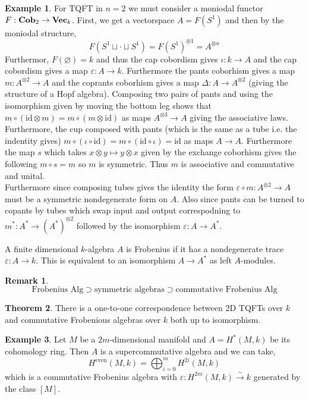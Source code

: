 \documentclass[12pt]{extarticle}
\newcommand{\id}{\mathrm{id}}
\theoremstyle{definition}
\newtheorem{theorem}{Theorem}[section]
\newtheorem{example}[theorem]{Example}
\newtheorem{remark}{Remark}
\newenvironment{definition}[1][Definition:]{\begin{trivlist}
\item[\hskip \labelsep {\bfseries #1}]}{\end{trivlist}}
\begin{document}
\begin{example}
For TQFT in $n = 2$ we must consider a moniodal functor $F : \mathbf{Cob}_2 \to \mathbf{Vec}_k$. First, we get a vectorspace $A = F(S^1)$ and then by the moniodal structure,
\[ F(S^1 \sqcup \cdot \sqcup S^1) = F(S^1)^{\otimes 1} = A^{\otimes n} \]
Furthermor, $F(\varnothing) = k$ and thus the cap cobordism gives $\iota : k \to A$ and the cap cobordism gives a map $\varepsilon : A \to k$. Furthermore the pants coborhism gives a map $m : A^{\otimes 2} \to A$ and the coprants coborhism gives a map $\Delta : A \to A^{\otimes 2}$ (giving the structure of a Hopf algebra). Composing two pairs of pants and using the isomorphism given by moving the bottom leg shows that $m \circ (\id \otimes m) = m \circ (m \otimes \id)$ as maps $A^{\otimes 3} \to A$ giving the associative laws. Furthermore, the cup composed with pants (which is the same as a tube i.e. the indentity gives) $m \circ (\iota \circ \id) = m \circ (\id \circ \iota) = \id$ as maps $A \to A$. Furthermore the map $s$ which takes $x \otimes y \mapsto y \otimes x$ given by the exchange coborhism gives the following $m \circ s = m$ so $m$ is symmetric. Thus $m$ is associative and commutative and unital. 
\bigskip\\
Furthermore since composing tubes gives the identity the form $\varepsilon \circ m : A^{\otimes 2} \to A$ must be a symmetric nondegenerate form on $A$. Also since pants can be turned to copants by tubes which swap input and output correspodning to $m^* : A^* \to (A^*)^{\otimes 2}$ followed by the isomorphism $\varepsilon : A \to A^*$.
\end{example}

\begin{definition}
A finite dimensional $k$-algebra $A$ is Frobenius if it has a nondegenerate trace $\varepsilon : A \to k$. This is equivalent to an isomorphism $A \to A^*$ as left $A$-modules. 
\end{definition}

\begin{remark}
\[ \text{Frobenius Alg} \supset \text{symmetric algebras} \supset \text{commutative Frobenius Alg} \]
\end{remark}

\begin{theorem}
There is a one-to-one correspondence between 2D TQFTs over $k$ and commutative Frobenious algebras over $k$ both up to isomorphism. 
\end{theorem}

\begin{example}
Let $M$ be a $2m$-dimensional manifold and $A = H^*(M, k)$ be its cohomology ring. Then $A$ is a supercommutative algebra and we can take,
\[ H^{\text{even}}(M, k) = \bigoplus_{i = 0}^m H^{2i}(M, k) \]
which is a commutative Frobenius algebra with $\varepsilon : H^{2m}(M, k) \xrightarrow{\sim} k$ generated by the class $[M]$.  
\end{example}
\end{document}
